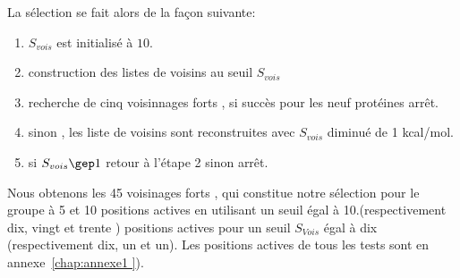 La sélection se fait alors de la façon suivante:

\begin{enumerate}
\item $S_{vois}$ est initialisé à $10$.
\item construction des listes de voisins au seuil $S_{vois}$  
\item recherche de cinq voisinnages forts , si succès pour les neuf protéines arrêt.
\item sinon , les liste de voisins sont reconstruites avec $S_{vois}$  diminué de 1 kcal/mol. 
\item si $ S_{vois} \gep 1 $ retour à l'étape 2 sinon arrêt.  
\end{enumerate}

Nous obtenons les 45 voisinages forts , qui constitue notre sélection  pour le groupe à 5 et 10 positions actives  en utilisant un seuil égal à 10.(respectivement dix, vingt et trente ) positions actives pour un seuil $S_{Vois}$ égal à dix (respectivement dix, un et un). Les positions actives de tous les tests sont en annexe~\ref{chap:annexe1 }).


